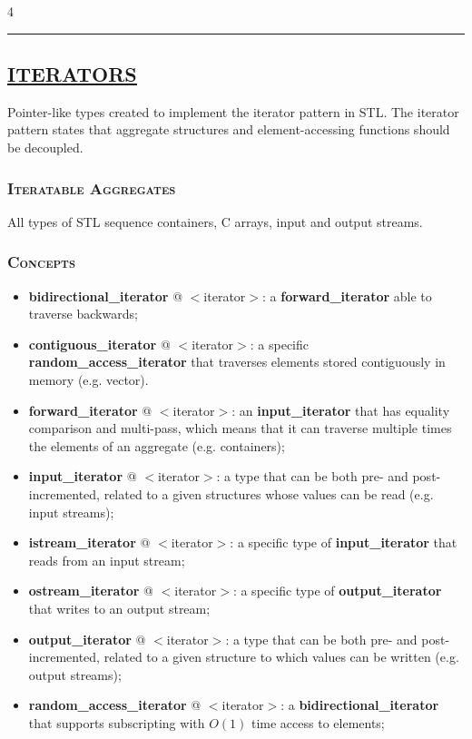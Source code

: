 \documentclass[10pt]{article}
\begin{document}
\begin{multicols*}{4}
{}

\par\noindent\rule{197pt}{0.4pt}

{\color{Blue}
\subsection*{\href{https://en.cppreference.com/w/cpp/iterator}{\underline{ITERATORS}}}	
\noindent
Pointer-like types created to implement the iterator pattern in STL. The iterator pattern states that aggregate structures and element-accessing functions should be decoupled.

\subsubsection*{\textsc{Iteratable Aggregates}} 
\noindent
All types of STL sequence containers, C arrays, input and output streams.

\subsubsection*{\textsc{Concepts}} 
\begin{itemize}[leftmargin=*,topsep=0.25pt]
  \setlength\itemsep{-1.8pt}
	\item \textbf{bidirectional\_iterator} @ $<$iterator$>$: a \textbf{for\-ward\_ite\-ra\-tor} able to traverse backwards; 
	\item \textbf{contiguous\_iterator} @ $<$iterator$>$: a specific \textbf{ran\-dom\_ac\-cess\_i\-te\-ra\-tor} that traverses elements stored contiguously in memory (e.g. vector). 
	\item \textbf{forward\_iterator} @ $<$iterator$>$: an \textbf{input\_iterator} that has equality comparison and multi-pass, which means that it can traverse multiple times the elements of an aggregate (e.g. containers); 
	\item \textbf{input\_iterator} @ $<$iterator$>$: a type that can be both pre- and post-incremented, related to a given structures whose values can be read (e.g. input streams);
	\item \textbf{istream\_iterator} @ $<$iterator$>$: a specific type of \textbf{in\-put\_i\-te\-ra\-tor} that reads from an input stream;
	\item \textbf{ostream\_iterator} @ $<$iterator$>$: a specific type of \textbf{out\-put\_i\-te\-ra\-tor} that writes to an output stream;
	\item \textbf{output\_iterator} @ $<$iterator$>$: a type that can be both pre- and post-incremented, related to a given structure to which values can be written (e.g. output streams);
	\item \textbf{random\_access\_iterator} @ $<$iterator$>$: a \textbf{bidirectional\_iterator} that supports subscripting with $O(1)$ time access to elements; 
\end{itemize}

}
\end{multicols*}
\end{document}
